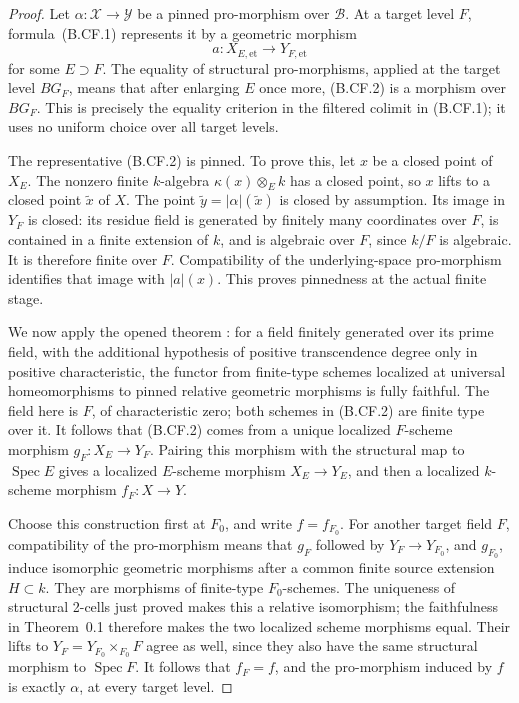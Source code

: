 \begin{proof}
Let \(\alpha:\mathcal X\to\mathcal Y\) be a pinned pro-morphism over
\(\mathcal B\). At a target level \(F\), formula~(B.CF.1) represents
it by a geometric morphism
\[
             a:X_{E,\mathrm{et}}\longrightarrow Y_{F,\mathrm{et}}
                                                        \tag{B.CF.2}
\]
for some \(E\supset F\). The equality of structural pro-morphisms,
applied at the target level \(BG_F\), means that after enlarging \(E\)
once more, (B.CF.2) is a morphism over \(BG_F\). This is precisely the
equality criterion in the filtered colimit in (B.CF.1); it uses no
uniform choice over all target levels.

The representative (B.CF.2) is pinned. To prove this, let \(x\) be a
closed point of \(X_E\). The nonzero finite \(k\)-algebra
\(\kappa(x)\otimes_E k\) has a closed point, so \(x\) lifts to a
closed point \(\widetilde x\) of \(X\). The point
\(\widetilde y=|\alpha|(\widetilde x)\) is closed by assumption.
Its image in \(Y_F\) is closed: its residue field is generated by
finitely many coordinates over \(F\), is contained in a finite
extension of \(k\), and is algebraic over \(F\), since \(k/F\) is
algebraic. It is therefore finite over \(F\). Compatibility of the
underlying-space pro-morphism identifies that image with \(|a|(x)\).
This proves pinnedness at the actual finite stage.

We now apply the opened theorem
\citep[Theorem~0.1 and the equivalent formulation~(0.2)]{CarlsonHaineWolf2024}:
for a field finitely generated over its prime field, with the additional
hypothesis of positive transcendence degree only in positive
characteristic, the functor from finite-type schemes localized at
universal homeomorphisms to pinned relative geometric morphisms is
fully faithful. The field here is \(F\), of characteristic zero;
both schemes in (B.CF.2) are finite type over it. It follows that
(B.CF.2) comes from a unique localized \(F\)-scheme morphism
\(g_F:X_E\to Y_F\). Pairing this morphism with the structural map
to \(\operatorname{Spec}E\) gives a localized \(E\)-scheme morphism
\(X_E\to Y_E\), and then a localized \(k\)-scheme morphism
\(f_F:X\to Y\).

Choose this construction first at \(F_0\), and write \(f=f_{F_0}\).
For another target field \(F\), compatibility of the pro-morphism
means that \(g_F\) followed by \(Y_F\to Y_{F_0}\), and \(g_{F_0}\),
induce isomorphic geometric morphisms after a common finite source
extension \(H\subset k\). They are morphisms of finite-type
\(F_0\)-schemes. The uniqueness of structural 2-cells just proved
makes this a relative isomorphism; the faithfulness in Theorem~0.1
therefore makes the two localized scheme morphisms equal.
Their lifts to \(Y_F=Y_{F_0}\times_{F_0}F\) agree as well, since they
also have the same structural morphism to \(\operatorname{Spec}F\).
It follows that \(f_F=f\), and the pro-morphism induced by \(f\)
is exactly \(\alpha\), at every target level.


\end{proof}
